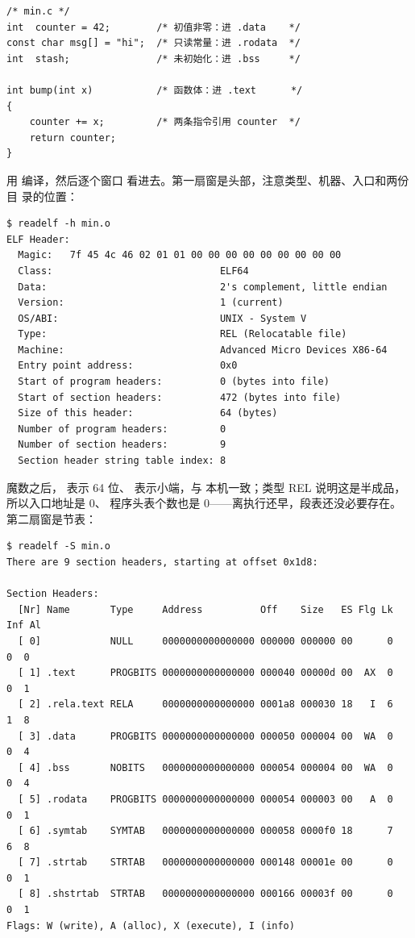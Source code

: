 \begin{lstlisting}
/* min.c */
int  counter = 42;        /* 初值非零：进 .data    */
const char msg[] = "hi";  /* 只读常量：进 .rodata  */
int  stash;               /* 未初始化：进 .bss     */

int bump(int x)           /* 函数体：进 .text      */
{
    counter += x;         /* 两条指令引用 counter  */
    return counter;
}
\end{lstlisting}

用  编译，然后逐个窗口
看进去。第一扇窗是头部，注意类型、机器、入口和两份目
录的位置：

\begin{lstlisting}
$ readelf -h min.o
ELF Header:
  Magic:   7f 45 4c 46 02 01 01 00 00 00 00 00 00 00 00 00
  Class:                             ELF64
  Data:                              2's complement, little endian
  Version:                           1 (current)
  OS/ABI:                            UNIX - System V
  Type:                              REL (Relocatable file)
  Machine:                           Advanced Micro Devices X86-64
  Entry point address:               0x0
  Start of program headers:          0 (bytes into file)
  Start of section headers:          472 (bytes into file)
  Size of this header:               64 (bytes)
  Number of program headers:         0
  Number of section headers:         9
  Section header string table index: 8
\end{lstlisting}

魔数之后， 表示 64 位、 表示小端，与
本机一致；类型 REL 说明这是半成品，所以入口地址是 0、
程序头表个数也是 0——离执行还早，段表还没必要存在。
第二扇窗是节表：

\begin{lstlisting}
$ readelf -S min.o
There are 9 section headers, starting at offset 0x1d8:

Section Headers:
  [Nr] Name       Type     Address          Off    Size   ES Flg Lk Inf Al
  [ 0]            NULL     0000000000000000 000000 000000 00      0   0  0
  [ 1] .text      PROGBITS 0000000000000000 000040 00000d 00  AX  0   0  1
  [ 2] .rela.text RELA     0000000000000000 0001a8 000030 18   I  6   1  8
  [ 3] .data      PROGBITS 0000000000000000 000050 000004 00  WA  0   0  4
  [ 4] .bss       NOBITS   0000000000000000 000054 000004 00  WA  0   0  4
  [ 5] .rodata    PROGBITS 0000000000000000 000054 000003 00   A  0   0  1
  [ 6] .symtab    SYMTAB   0000000000000000 000058 0000f0 18      7   6  8
  [ 7] .strtab    STRTAB   0000000000000000 000148 00001e 00      0   0  1
  [ 8] .shstrtab  STRTAB   0000000000000000 000166 00003f 00      0   0  1
Flags: W (write), A (alloc), X (execute), I (info)
\end{lstlisting}

